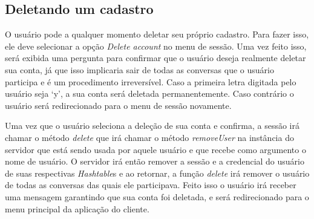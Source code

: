 \documentclass[../main.tex]{subfiles}
\begin{document}
\subsection{Deletando um cadastro}

O usuário pode a qualquer momento deletar seu próprio cadastro.
Para fazer isso, ele deve selecionar a opção \textit{Delete account} no menu de sessão.
Uma vez feito isso, será exibida uma pergunta para confirmar que o usuário deseja realmente deletar sua conta, já que isso implicaria sair de todas as conversas que o usuário participa e é um procedimento irreversível.
Caso a primeira letra digitada pelo usuário seja `y', a sua conta será deletada permanentemente.
Caso contrário o usuário será redirecionado para o menu de sessão novamente.

Uma vez que o usuário seleciona a deleção de sua conta e confirma, a sessão irá chamar o método \textit{delete} que irá chamar o método \textit{removeUser} na instância do servidor que está sendo usada por aquele usuário e que recebe como argumento o nome de usuário.
O servidor irá então remover a sessão e a credencial do usuário de suas respectivas \textit{Hashtable}s e ao retornar, a função \textit{delete} irá remover o usuário de todas as conversas das quais ele participava.
Feito isso o usuário irá receber uma mensagem garantindo que sua conta foi deletada, e será redirecionado para o menu principal da aplicação do cliente.
\end{document}
